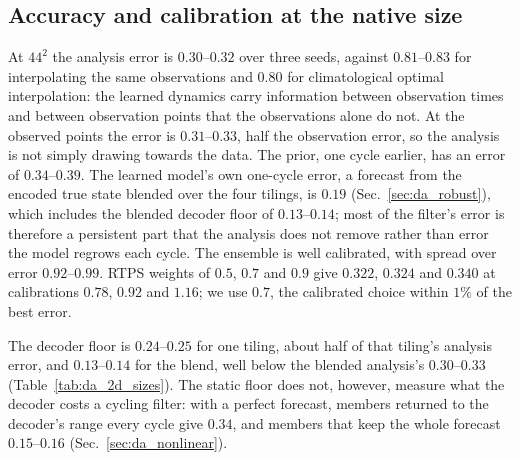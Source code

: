 \subsection{Accuracy and calibration at the native size}
\label{sec:da_accuracy}

At $44^2$ the analysis error is $0.30$--$0.32$ over three seeds, against $0.81$--$0.83$
for interpolating the same observations and $0.80$ for climatological
optimal interpolation: the learned dynamics carry information between
observation times and between observation points that the observations
alone do not. At the observed points the error is $0.31$--$0.33$, half the
observation error, so the analysis is not simply drawing towards the
data. The prior, one cycle earlier, has an error of $0.34$--$0.39$. The
learned model's own one-cycle error, a forecast from the encoded true
state blended over the four tilings, is $0.19$ (Sec.~\ref{sec:da_robust}),
which includes the blended decoder floor of $0.13$--$0.14$; most of the
filter's error is therefore a persistent part that the analysis does not
remove rather than error the model regrows each cycle.
The ensemble is well calibrated, with spread over error $0.92$--$0.99$.
RTPS weights of $0.5$, $0.7$ and $0.9$ give $0.322$, $0.324$ and $0.340$ at
calibrations $0.78$, $0.92$ and $1.16$; we use $0.7$, the calibrated choice
within $1\%$ of the best error.

 The decoder floor is $0.24$--$0.25$ for one
tiling, about half of that tiling's analysis error, and $0.13$--$0.14$ for the
blend, well below the blended analysis's $0.30$--$0.33$
(Table~\ref{tab:da_2d_sizes}). The static floor does not, however, measure
what the decoder costs a cycling filter: with a perfect forecast, members
returned to the decoder's range every cycle give $0.34$, and members that
keep the whole forecast $0.15$--$0.16$ (Sec.~\ref{sec:da_nonlinear}).


